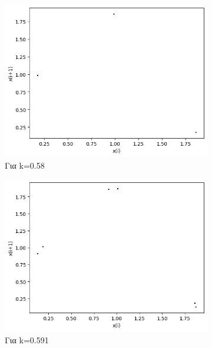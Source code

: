 \begin{figure}[h!]
\begin{subfigure}[c]{0.4\textwidth}
		\includegraphics[width=\textwidth]{LateX images/graphs q05/g9}
		\caption{Για k=0.58}
		\label{f:k33}
	\end{subfigure}
	\hfill
	\begin{subfigure}[c]{0.4\textwidth}
		\centering
		\includegraphics[width=\textwidth]{LateX images/graphs q05/g10}
		\caption{Για k=0.591}
		\label{f:k35}
	\end{subfigure}
	\hfill
	\begin{subfigure}[b]{0.4\textwidth}
		\centering

\end{subfigure}
\end{figure}
